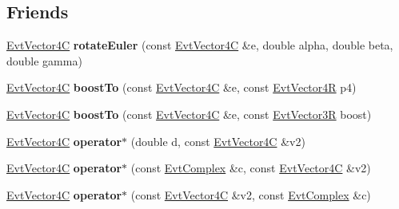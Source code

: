 \subsection*{Friends}
\begin{DoxyCompactItemize}
\item 
\hypertarget{class_evt_vector4_c_ab68ac77a97ccc818551a40123d3e1c8d}{}\hyperlink{class_evt_vector4_c}{Evt\+Vector4\+C} {\bfseries rotate\+Euler} (const \hyperlink{class_evt_vector4_c}{Evt\+Vector4\+C} \&e, double alpha, double beta, double gamma)\label{class_evt_vector4_c_ab68ac77a97ccc818551a40123d3e1c8d}

\item 
\hypertarget{class_evt_vector4_c_a37e6f7df4f735f0229c1b832e8c8f154}{}\hyperlink{class_evt_vector4_c}{Evt\+Vector4\+C} {\bfseries boost\+To} (const \hyperlink{class_evt_vector4_c}{Evt\+Vector4\+C} \&e, const \hyperlink{class_evt_vector4_r}{Evt\+Vector4\+R} p4)\label{class_evt_vector4_c_a37e6f7df4f735f0229c1b832e8c8f154}

\item 
\hypertarget{class_evt_vector4_c_a7d45af720ccd07e09a9333eee85abbc2}{}\hyperlink{class_evt_vector4_c}{Evt\+Vector4\+C} {\bfseries boost\+To} (const \hyperlink{class_evt_vector4_c}{Evt\+Vector4\+C} \&e, const \hyperlink{class_evt_vector3_r}{Evt\+Vector3\+R} boost)\label{class_evt_vector4_c_a7d45af720ccd07e09a9333eee85abbc2}

\item 
\hypertarget{class_evt_vector4_c_aca68c41ffb8f11e96c96d268acacc655}{}\hyperlink{class_evt_vector4_c}{Evt\+Vector4\+C} {\bfseries operator$\ast$} (double d, const \hyperlink{class_evt_vector4_c}{Evt\+Vector4\+C} \&v2)\label{class_evt_vector4_c_aca68c41ffb8f11e96c96d268acacc655}

\item 
\hypertarget{class_evt_vector4_c_a55ede0e47d75e1a11c3188e0612aa7f0}{}\hyperlink{class_evt_vector4_c}{Evt\+Vector4\+C} {\bfseries operator$\ast$} (const \hyperlink{class_evt_complex}{Evt\+Complex} \&c, const \hyperlink{class_evt_vector4_c}{Evt\+Vector4\+C} \&v2)\label{class_evt_vector4_c_a55ede0e47d75e1a11c3188e0612aa7f0}

\item 
\hypertarget{class_evt_vector4_c_a38943dedc58976cd73fa854ee05a5f42}{}\hyperlink{class_evt_vector4_c}{Evt\+Vector4\+C} {\bfseries operator$\ast$} (const \hyperlink{class_evt_vector4_c}{Evt\+Vector4\+C} \&v2, const \hyperlink{class_evt_complex}{Evt\+Complex} \&c)\label{class_evt_vector4_c_a38943dedc58976cd73fa854ee05a5f42}


\end{DoxyCompactItemize}
